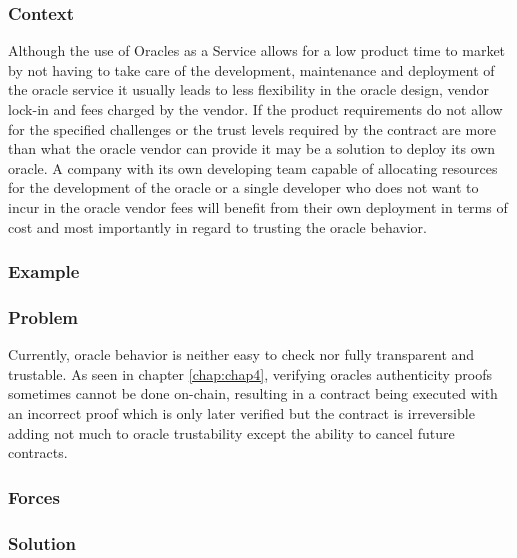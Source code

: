 \subsubsection{Context}
Although the use of Oracles as a Service allows for a low product time to market by not having to take care of the development, maintenance and deployment of the oracle service it usually leads to less flexibility in the oracle design, vendor lock-in and fees charged by the vendor. If the product requirements do not allow for the specified challenges or the trust levels required by the contract are more than what the oracle vendor can provide it may be a solution to deploy its own oracle. A company with its own developing team capable of allocating resources for the development of the oracle or a single developer who does not want to incur in the oracle vendor fees will benefit from their own deployment in terms of cost and most importantly in regard to trusting the oracle behavior.

\subsubsection{Example}


\subsubsection{Problem}
Currently, oracle behavior is neither easy to check nor fully transparent and trustable. As seen in chapter \ref{chap:chap4}, verifying oracles authenticity proofs sometimes cannot be done on-chain, resulting in a contract being executed with an incorrect proof which is only later verified but the contract is irreversible adding not much to oracle trustability except the ability to cancel future contracts.

\subsubsection{Forces}
\subsubsection{Solution}

